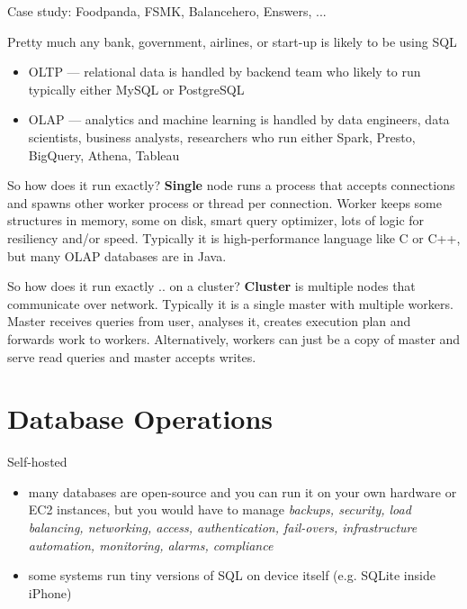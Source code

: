 \documentclass[t,pdf]{beamer}
\begin{document}
\begin{frame}{Case study: Foodpanda, FSMK, Balancehero, Enswers, ...}

Pretty much any bank, government, airlines, or start-up is likely to be using SQL

\begin{itemize}
    \item OLTP — relational data is handled by backend team who likely to run typically either MySQL or PostgreSQL
    \item OLAP — analytics and machine learning is handled by data engineers, data scientists, business analysts, researchers who run either Spark, Presto, BigQuery, Athena, Tableau
\end{itemize}
\end{frame}

\begin{frame}{So how does it run exactly?}
\textbf{Single} node runs a process that accepts connections and spawns other worker process or thread per connection. Worker keeps some structures in memory, some on disk, smart query optimizer, lots of logic for resiliency and/or speed. Typically it is high-performance language like C or C++, but many OLAP databases are in Java.
\end{frame}

\begin{frame}{So how does it run exactly .. on a cluster?}
\textbf{Cluster} is multiple nodes that communicate over network. Typically it is a single master with multiple workers. Master receives queries from user, analyses it, creates execution plan and forwards work to workers. Alternatively, workers can just be a copy of master and serve read queries and master accepts writes.
\end{frame}

\section{Database Operations}

\begin{frame}{Self-hosted}
\begin{itemize}
    \item many databases are open-source and you can run it on your own hardware or EC2 instances, but you would have to manage \textit{backups, security, load balancing, networking, access, authentication, fail-overs, infrastructure automation, monitoring, alarms, compliance}
    \item some systems run tiny versions of SQL on device itself (e.g. SQLite inside iPhone)
\end{itemize}
\end{frame}
\end{document}
